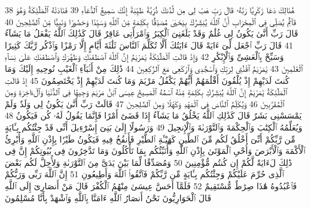 {\tiny\colorbox{cl_aya}{38}} هُنَالِكَ دَعَا زَكَرِيَّا رَبَّهُۥ قَالَ رَبِّ هَبْ لِى مِن لَّدُنكَ ذُرِّيَّةً طَيِّبَةً إِنَّكَ سَمِيعُ ٱلدُّعَآءِ
{\tiny\colorbox{cl_aya}{39}} فَنَادَتْهُ ٱلْمَلَٰٓئِكَةُ وَهُوَ قَآئِمٌ يُصَلِّى فِى ٱلْمِحْرَابِ أَنَّ ٱللَّهَ يُبَشِّرُكَ بِيَحْيَىٰ مُصَدِّقًۢا بِكَلِمَةٍ مِّنَ ٱللَّهِ وَسَيِّدًا وَحَصُورًا وَنَبِيًّا مِّنَ ٱلصَّٰلِحِينَ
{\tiny\colorbox{cl_aya}{40}} قَالَ رَبِّ أَنَّىٰ يَكُونُ لِى غُلَٰمٌ وَقَدْ بَلَغَنِىَ ٱلْكِبَرُ وَٱمْرَأَتِى عَاقِرٌ قَالَ كَذَٰلِكَ ٱللَّهُ يَفْعَلُ مَا يَشَآءُ
{\tiny\colorbox{cl_aya}{41}} قَالَ رَبِّ ٱجْعَل لِّىٓ ءَايَةً قَالَ ءَايَتُكَ أَلَّا تُكَلِّمَ ٱلنَّاسَ ثَلَٰثَةَ أَيَّامٍ إِلَّا رَمْزًا وَٱذْكُر رَّبَّكَ كَثِيرًا وَسَبِّحْ بِٱلْعَشِىِّ وَٱلْإِبْكَٰرِ
{\tiny\colorbox{cl_aya}{42}} وَإِذْ قَالَتِ ٱلْمَلَٰٓئِكَةُ يَٰمَرْيَمُ إِنَّ ٱللَّهَ ٱصْطَفَىٰكِ وَطَهَّرَكِ وَٱصْطَفَىٰكِ عَلَىٰ نِسَآءِ ٱلْعَٰلَمِينَ
{\tiny\colorbox{cl_aya}{43}} يَٰمَرْيَمُ ٱقْنُتِى لِرَبِّكِ وَٱسْجُدِى وَٱرْكَعِى مَعَ ٱلرَّٰكِعِينَ
{\tiny\colorbox{cl_aya}{44}} ذَٰلِكَ مِنْ أَنۢبَآءِ ٱلْغَيْبِ نُوحِيهِ إِلَيْكَ وَمَا كُنتَ لَدَيْهِمْ إِذْ يُلْقُونَ أَقْلَٰمَهُمْ أَيُّهُمْ يَكْفُلُ مَرْيَمَ وَمَا كُنتَ لَدَيْهِمْ إِذْ يَخْتَصِمُونَ
{\tiny\colorbox{cl_aya}{45}} إِذْ قَالَتِ ٱلْمَلَٰٓئِكَةُ يَٰمَرْيَمُ إِنَّ ٱللَّهَ يُبَشِّرُكِ بِكَلِمَةٍ مِّنْهُ ٱسْمُهُ ٱلْمَسِيحُ عِيسَى ٱبْنُ مَرْيَمَ وَجِيهًا فِى ٱلدُّنْيَا وَٱلْءَاخِرَةِ وَمِنَ ٱلْمُقَرَّبِينَ
{\tiny\colorbox{cl_aya}{46}} وَيُكَلِّمُ ٱلنَّاسَ فِى ٱلْمَهْدِ وَكَهْلًا وَمِنَ ٱلصَّٰلِحِينَ
{\tiny\colorbox{cl_aya}{47}} قَالَتْ رَبِّ أَنَّىٰ يَكُونُ لِى وَلَدٌ وَلَمْ يَمْسَسْنِى بَشَرٌ قَالَ كَذَٰلِكِ ٱللَّهُ يَخْلُقُ مَا يَشَآءُ إِذَا قَضَىٰٓ أَمْرًا فَإِنَّمَا يَقُولُ لَهُۥ كُن فَيَكُونُ
{\tiny\colorbox{cl_aya}{48}} وَيُعَلِّمُهُ ٱلْكِتَٰبَ وَٱلْحِكْمَةَ وَٱلتَّوْرَىٰةَ وَٱلْإِنجِيلَ
{\tiny\colorbox{cl_aya}{49}} وَرَسُولًا إِلَىٰ بَنِىٓ إِسْرَٰٓءِيلَ أَنِّى قَدْ جِئْتُكُم بِـَٔايَةٍ مِّن رَّبِّكُمْ أَنِّىٓ أَخْلُقُ لَكُم مِّنَ ٱلطِّينِ كَهَيْـَٔةِ ٱلطَّيْرِ فَأَنفُخُ فِيهِ فَيَكُونُ طَيْرًۢا بِإِذْنِ ٱللَّهِ وَأُبْرِئُ ٱلْأَكْمَهَ وَٱلْأَبْرَصَ وَأُحْىِ ٱلْمَوْتَىٰ بِإِذْنِ ٱللَّهِ وَأُنَبِّئُكُم بِمَا تَأْكُلُونَ وَمَا تَدَّخِرُونَ فِى بُيُوتِكُمْ إِنَّ فِى ذَٰلِكَ لَءَايَةً لَّكُمْ إِن كُنتُم مُّؤْمِنِينَ
{\tiny\colorbox{cl_aya}{50}} وَمُصَدِّقًا لِّمَا بَيْنَ يَدَىَّ مِنَ ٱلتَّوْرَىٰةِ وَلِأُحِلَّ لَكُم بَعْضَ ٱلَّذِى حُرِّمَ عَلَيْكُمْ وَجِئْتُكُم بِـَٔايَةٍ مِّن رَّبِّكُمْ فَٱتَّقُوا۟ ٱللَّهَ وَأَطِيعُونِ
{\tiny\colorbox{cl_aya}{51}} إِنَّ ٱللَّهَ رَبِّى وَرَبُّكُمْ فَٱعْبُدُوهُ هَٰذَا صِرَٰطٌ مُّسْتَقِيمٌ
{\tiny\colorbox{cl_aya}{52}} فَلَمَّآ أَحَسَّ عِيسَىٰ مِنْهُمُ ٱلْكُفْرَ قَالَ مَنْ أَنصَارِىٓ إِلَى ٱللَّهِ قَالَ ٱلْحَوَارِيُّونَ نَحْنُ أَنصَارُ ٱللَّهِ ءَامَنَّا بِٱللَّهِ وَٱشْهَدْ بِأَنَّا مُسْلِمُونَ
